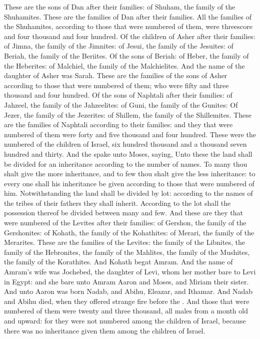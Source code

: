 \begin{biblechapter}
\verse These are the sons of Dan after their families: of Shuham, the family of the Shuhamites. These are the families of Dan after their families.
\verse All the families of the Shuhamites, according to those that were numbered of them, were threescore and four thousand and four hundred.
\verse Of the children of Asher after their families: of Jimna, the family of the Jimnites: of Jesui, the family of the Jesuites: of Beriah, the family of the Beriites.
\verse Of the sons of Beriah: of Heber, the family of the Heberites: of Malchiel, the family of the Malchielites.
\verse And the name of the daughter of Asher was Sarah.
\verse These are the families of the sons of Asher according to those that were numbered of them; who were fifty and three thousand and four hundred.
\verse Of the sons of Naphtali after their families: of Jahzeel, the family of the Jahzeelites: of Guni, the family of the Gunites:
\verse Of Jezer, the family of the Jezerites: of Shillem, the family of the Shillemites.
\verse These are the families of Naphtali according to their families: and they that were numbered of them were forty and five thousand and four hundred.
\verse These were the numbered of the children of Israel, six hundred thousand and a thousand seven hundred and thirty.
\verse And the \LORD spake unto Moses, saying,
\verse Unto these the land shall be divided for an inheritance according to the number of names.
\verse To many thou shalt give the more inheritance, and to few thou shalt give the less inheritance: to every one shall his inheritance be given according to those that were numbered of him.
\verse Notwithstanding the land shall be divided by lot: according to the names of the tribes of their fathers they shall inherit.
\verse According to the lot shall the possession thereof be divided between many and few.
\verse And these are they that were numbered of the Levites after their families: of Gershon, the family of the Gershonites: of Kohath, the family of the Kohathites: of Merari, the family of the Merarites.
\verse These are the families of the Levites: the family of the Libnites, the family of the Hebronites, the family of the Mahlites, the family of the Mushites, the family of the Korathites. And Kohath begat Amram.
\verse And the name of Amram's wife was Jochebed, the daughter of Levi, whom her mother bare to Levi in Egypt: and she bare unto Amram Aaron and Moses, and Miriam their sister.
\verse And unto Aaron was born Nadab, and Abihu, Eleazar, and Ithamar.
\verse And Nadab and Abihu died, when they offered strange fire before the \LORD.
\verse And those that were numbered of them were twenty and three thousand, all males from a month old and upward: for they were not numbered among the children of Israel, because there was no inheritance given them among the children of Israel.

\end{biblechapter}
